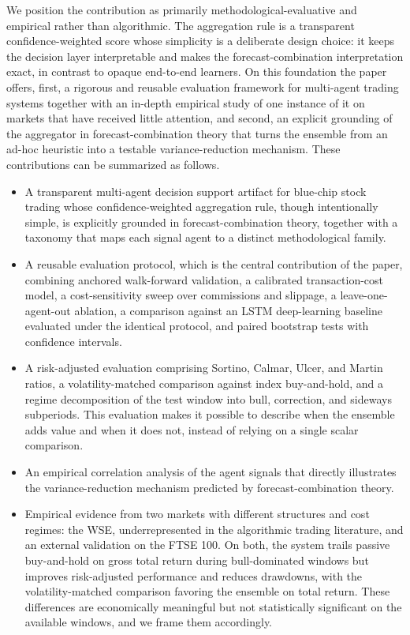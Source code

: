\documentclass{ieeeaccess}
\begin{document}
We position the contribution as primarily methodological-evaluative and empirical rather than algorithmic. The aggregation rule is a transparent confidence-weighted score whose simplicity is a deliberate design choice: it keeps the decision layer interpretable and makes the forecast-combination interpretation exact, in contrast to opaque end-to-end learners. On this foundation the paper offers, first, a rigorous and reusable evaluation framework for multi-agent trading systems together with an in-depth empirical study of one instance of it on markets that have received little attention, and second, an explicit grounding of the aggregator in forecast-combination theory that turns the ensemble from an ad-hoc heuristic into a testable variance-reduction mechanism. These contributions can be summarized as follows.
\begin{itemize}
\item A transparent multi-agent decision support artifact for blue-chip stock trading whose confidence-weighted aggregation rule, though intentionally simple, is explicitly grounded in forecast-combination theory, together with a taxonomy that maps each signal agent to a distinct methodological family.
\item A reusable evaluation protocol, which is the central contribution of the paper, combining anchored walk-forward validation, a calibrated transaction-cost model, a cost-sensitivity sweep over commissions and slippage, a leave-one-agent-out ablation, a comparison against an LSTM deep-learning baseline evaluated under the identical protocol, and paired bootstrap tests with confidence intervals.
\item A risk-adjusted evaluation comprising Sortino, Calmar, Ulcer, and Martin ratios, a volatility-matched comparison against index buy-and-hold, and a regime decomposition of the test window into bull, correction, and sideways subperiods. This evaluation makes it possible to describe when the ensemble adds value and when it does not, instead of relying on a single scalar comparison.
\item An empirical correlation analysis of the agent signals that directly illustrates the variance-reduction mechanism predicted by forecast-combination theory.
\item Empirical evidence from two markets with different structures and cost regimes: the WSE, underrepresented in the algorithmic trading literature, and an external validation on the FTSE 100. On both, the system trails passive buy-and-hold on gross total return during bull-dominated windows but improves risk-adjusted performance and reduces drawdowns, with the volatility-matched comparison favoring the ensemble on total return. These differences are economically meaningful but not statistically significant on the available windows, and we frame them accordingly.
\end{itemize}
\end{document}
